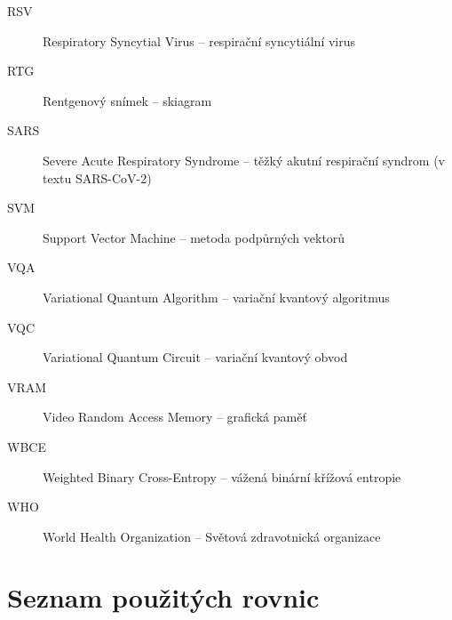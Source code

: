 \documentclass[12pt, a4paper]{report}
\begin{document}
\begin{description}
  \item[RSV] Respiratory Syncytial Virus – respirační syncytiální virus
  \item[RTG] Rentgenový snímek – skiagram
  \item[SARS] Severe Acute Respiratory Syndrome – těžký akutní respirační syndrom (v textu SARS-CoV-2)
  \item[SVM] Support Vector Machine – metoda podpůrných vektorů
  \item[VQA] Variational Quantum Algorithm – variační kvantový algoritmus
  \item[VQC] Variational Quantum Circuit – variační kvantový obvod
  \item[VRAM] Video Random Access Memory – grafická paměť
  \item[WBCE] Weighted Binary Cross-Entropy – vážená binární křížová entropie
  \item[WHO] World Health Organization – Světová zdravotnická organizace
\end{description}

\chapter*{Seznam použitých rovnic}
\listofmyequations
\end{document}
